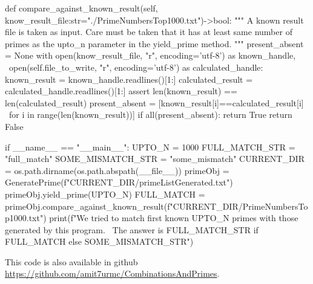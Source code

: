 \documentclass[10pt, twoside]{article}
\begin{document}
\begin{appendices}
\begin{python}
    def compare_against_known_result(self, know_result_file:str="./PrimeNumbersTop1000.txt")->bool:
        """
        A known result file is taken as input. 
        Care must be taken that it has at least same number of primes 
        as the upto_n parameter in the yield_prime method.
        """
        present_absent = None
        with open(know_result_file, "r", encoding='utf-8') as known_handle, \
             open(self.file_to_write, "r", encoding='utf-8') as calculated_handle:
            known_result = known_handle.readlines()[1:]
            calculated_result = calculated_handle.readlines()[1:]
            assert len(known_result) == len(calculated_result)
            present_absent = [known_result[i]==calculated_result[i] \
                              for i in range(len(known_result))]
        if all(present_absent):
            return True
        return False



if __name__ == "__main__":
    UPTO_N = 1000
    FULL_MATCH_STR = "full_match"
    SOME_MISMATCH_STR = "some_mismatch"
    CURRENT_DIR = os.path.dirname(os.path.abspath(__file__))
    primeObj = GeneratePrime(f"{CURRENT_DIR}/primeListGenerated.txt")
    primeObj.yield_prime(UPTO_N)
    FULL_MATCH = primeObj.compare_against_known_result(f"{CURRENT_DIR}/PrimeNumbersTop1000.txt")
    print(f"We tried to match first known {UPTO_N} primes with those generated by this program. \
    The answer is {FULL_MATCH_STR if FULL_MATCH else SOME_MISMATCH_STR}")
	\end{python}	
	This code is also available in github \url{https://github.com/amit7urmc/CombinationsAndPrimes}.

\end{appendices}
\end{document}
